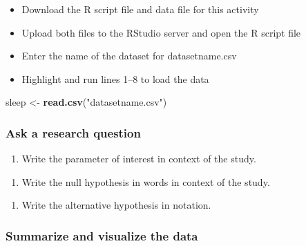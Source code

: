\documentclass[
]{report}
\newenvironment{Shaded}{\begin{snugshade}}{\end{snugshade}}
\newcommand{\FunctionTok}[1]{\textcolor[rgb]{0.13,0.29,0.53}{\textbf{#1}}}
\newcommand{\NormalTok}[1]{#1}
\newcommand{\OtherTok}[1]{\textcolor[rgb]{0.56,0.35,0.01}{#1}}
\newcommand{\StringTok}[1]{\textcolor[rgb]{0.31,0.60,0.02}{#1}}
\providecommand{\tightlist}{%
  \setlength{\itemsep}{0pt}\setlength{\parskip}{0pt}}
\begin{document}
\begin{itemize}
\item
  Download the R script file and data file for this activity
\item
  Upload both files to the RStudio server and open the R script file
\item
  Enter the name of the dataset for datasetname.csv
\item
  Highlight and run lines 1--8 to load the data
\end{itemize}

\begin{Shaded}
\begin{Highlighting}[]
\NormalTok{sleep }\OtherTok{\textless{}{-}} \FunctionTok{read.csv}\NormalTok{(}\StringTok{"datasetname.csv"}\NormalTok{)}
\end{Highlighting}
\end{Shaded}

\subsubsection*{Ask a research question}\label{ask-a-research-question-1}

\begin{enumerate}
\def\labelenumi{\arabic{enumi}.}
\tightlist
\item
  Write the parameter of interest in context of the study.
\end{enumerate}

\vspace{1in}

\begin{enumerate}
\def\labelenumi{\arabic{enumi}.}
\setcounter{enumi}{1}
\tightlist
\item
  Write the null hypothesis in words in context of the study.
\end{enumerate}

\vspace{1in}

\begin{enumerate}
\def\labelenumi{\arabic{enumi}.}
\setcounter{enumi}{2}
\tightlist
\item
  Write the alternative hypothesis in notation.
\end{enumerate}

\vspace{0.4in}

\subsubsection*{Summarize and visualize the data}\label{summarize-and-visualize-the-data-1}
\end{document}
